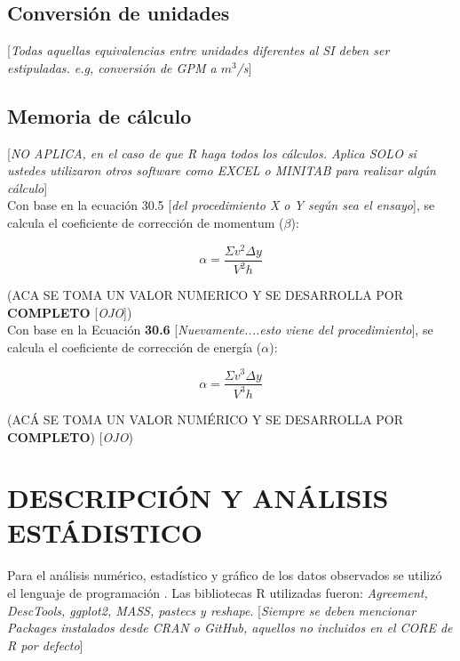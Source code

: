 \documentclass[11pt, letterpaper]{article}
\begin{document}
\subsection{Conversión de unidades}
[\emph{Todas aquellas equivalencias entre unidades diferentes al SI deben ser estipuladas. e.g, conversión de GPM a ${m}^{3}$/s}]

\subsection{Memoria de cálculo}
[\emph{NO APLICA, en el caso de que R haga todos los cálculos. Aplica SOLO si ustedes utilizaron otros software como EXCEL o MINITAB para realizar algún cálculo}]\\

Con base en la ecuación 30.5 [\emph{del procedimiento X o Y según sea el ensayo}], se calcula el coeficiente de corrección de momentum ($\beta$):

\begin{equation}
\label{eq:momentum}
\alpha =\frac{ \Sigma {v}^{2} \Delta y} {{V}^{2} h} 
\end{equation} %

(ACA SE TOMA UN VALOR NUMERICO Y SE DESARROLLA POR \textbf{COMPLETO} [\emph{OJO}])\\

Con base en la Ecuación \textbf{30.6} [\emph{Nuevamente....esto viene del procedimiento}], se calcula el coeficiente de corrección de energía ($\alpha$):

\begin{equation}
\label{eq:CEnergia}
\alpha =\frac{ \Sigma {v}^{3} \Delta y} {{V}^{3} h} 
\end{equation} %

(ACÁ SE TOMA UN VALOR NUMÉRICO Y SE DESARROLLA POR \textbf{COMPLETO}) [\emph{OJO})\\

\section{DESCRIPCIÓN Y ANÁLISIS ESTÁDISTICO}

Para el análisis numérico, estadístico y gráfico de los datos observados se utilizó el lenguaje de programación \cite{rstudio}. Las bibliotecas R utilizadas fueron: \emph{Agreement, DescTools, ggplot2, MASS, pastecs y reshape}. [\emph{Siempre se deben mencionar Packages instalados desde CRAN o GitHub, aquellos no incluidos en el CORE de R por defecto}]\\
\end{document}
